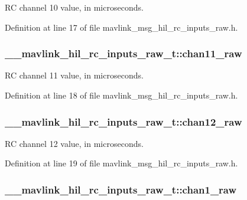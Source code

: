 R\-C channel 10 value, in microseconds. 



Definition at line 17 of file mavlink\-\_\-msg\-\_\-hil\-\_\-rc\-\_\-inputs\-\_\-raw.\-h.

\hypertarget{struct____mavlink__hil__rc__inputs__raw__t_a09b92c1ec569948809c152e74bd61655}{
\subsubsection[{chan11\-\_\-raw}]{ \-\_\-\-\_\-mavlink\-\_\-hil\-\_\-rc\-\_\-inputs\-\_\-raw\-\_\-t\-::chan11\-\_\-raw}}\label{struct____mavlink__hil__rc__inputs__raw__t_a09b92c1ec569948809c152e74bd61655}


R\-C channel 11 value, in microseconds. 



Definition at line 18 of file mavlink\-\_\-msg\-\_\-hil\-\_\-rc\-\_\-inputs\-\_\-raw.\-h.

\hypertarget{struct____mavlink__hil__rc__inputs__raw__t_a5967e01d1c858a6136505185d183a99e}{
\subsubsection[{chan12\-\_\-raw}]{ \-\_\-\-\_\-mavlink\-\_\-hil\-\_\-rc\-\_\-inputs\-\_\-raw\-\_\-t\-::chan12\-\_\-raw}}\label{struct____mavlink__hil__rc__inputs__raw__t_a5967e01d1c858a6136505185d183a99e}


R\-C channel 12 value, in microseconds. 



Definition at line 19 of file mavlink\-\_\-msg\-\_\-hil\-\_\-rc\-\_\-inputs\-\_\-raw.\-h.

\hypertarget{struct____mavlink__hil__rc__inputs__raw__t_a1c71d0b0abbff7055c0753a8b8a116bc}{
\subsubsection[{chan1\-\_\-raw}]{ \-\_\-\-\_\-mavlink\-\_\-hil\-\_\-rc\-\_\-inputs\-\_\-raw\-\_\-t\-::chan1\-\_\-raw}}\label{struct____mavlink__hil__rc__inputs__raw__t_a1c71d0b0abbff7055c0753a8b8a116bc}



